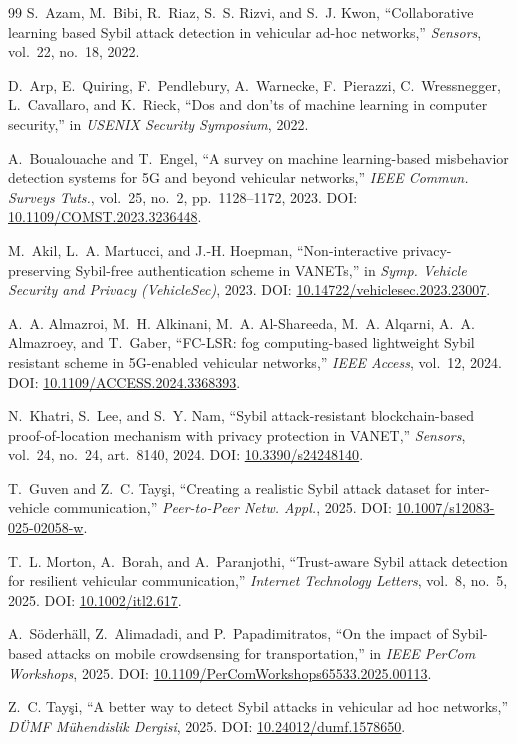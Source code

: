 \documentclass[conference]{IEEEtran}
\begin{document}
\begin{thebibliography}{99}
 S.~Azam, M.~Bibi, R.~Riaz, S.~S. Rizvi, and S.~J. Kwon, ``Collaborative learning based Sybil attack detection in vehicular ad-hoc networks,'' \emph{Sensors}, vol.~22, no.~18, 2022.

 D.~Arp, E.~Quiring, F.~Pendlebury, A.~Warnecke, F.~Pierazzi, C.~Wressnegger, L.~Cavallaro, and K.~Rieck, ``Dos and don'ts of machine learning in computer security,'' in \emph{USENIX Security Symposium}, 2022.

 A.~Boualouache and T.~Engel, ``A survey on machine learning-based misbehavior detection systems for 5G and beyond vehicular networks,'' \emph{IEEE Commun. Surveys Tuts.}, vol.~25, no.~2, pp.~1128--1172, 2023. DOI: \url{10.1109/COMST.2023.3236448}.

 M.~Akil, L.~A. Martucci, and J.-H. Hoepman, ``Non-interactive privacy-preserving Sybil-free authentication scheme in VANETs,'' in \emph{Symp. Vehicle Security and Privacy (VehicleSec)}, 2023. DOI: \url{10.14722/vehiclesec.2023.23007}.

 A.~A. Almazroi, M.~H. Alkinani, M.~A. Al-Shareeda, M.~A. Alqarni, A.~A. Almazroey, and T.~Gaber, ``FC-LSR: fog computing-based lightweight Sybil resistant scheme in 5G-enabled vehicular networks,'' \emph{IEEE Access}, vol.~12, 2024. DOI: \url{10.1109/ACCESS.2024.3368393}.

 N.~Khatri, S.~Lee, and S.~Y. Nam, ``Sybil attack-resistant blockchain-based proof-of-location mechanism with privacy protection in VANET,'' \emph{Sensors}, vol.~24, no.~24, art.~8140, 2024. DOI: \url{10.3390/s24248140}.

 T.~Guven and Z.~C. Tay\c{s}i, ``Creating a realistic Sybil attack dataset for inter-vehicle communication,'' \emph{Peer-to-Peer Netw. Appl.}, 2025. DOI: \url{10.1007/s12083-025-02058-w}.

 T.~L. Morton, A.~Borah, and A.~Paranjothi, ``Trust-aware Sybil attack detection for resilient vehicular communication,'' \emph{Internet Technology Letters}, vol.~8, no.~5, 2025. DOI: \url{10.1002/itl2.617}.

 A.~S\"oderh\"all, Z.~Alimadadi, and P.~Papadimitratos, ``On the impact of Sybil-based attacks on mobile crowdsensing for transportation,'' in \emph{IEEE PerCom Workshops}, 2025. DOI: \url{10.1109/PerComWorkshops65533.2025.00113}.

 Z.~C. Tay\c{s}i, ``A better way to detect Sybil attacks in vehicular ad hoc networks,'' \emph{D\"UMF M\"uhendislik Dergisi}, 2025. DOI: \url{10.24012/dumf.1578650}.


\end{thebibliography}
\end{document}
